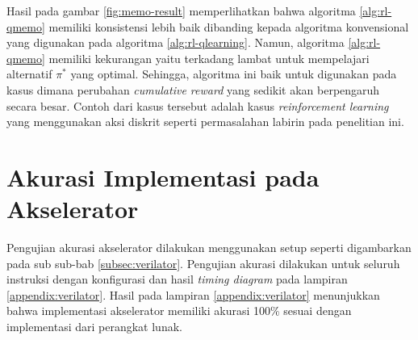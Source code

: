 Hasil pada gambar \ref{fig:memo-result} memperlihatkan bahwa algoritma \ref{alg:rl-qmemo} memiliki konsistensi lebih baik dibanding kepada algoritma konvensional yang digunakan pada algoritma \ref{alg:rl-qlearning}. Namun, algoritma \ref{alg:rl-qmemo} memiliki kekurangan yaitu terkadang lambat untuk mempelajari alternatif $\pi^*$ yang optimal. Sehingga, algoritma ini baik untuk digunakan pada kasus dimana perubahan \textit{cumulative reward} yang sedikit akan berpengaruh secara besar. Contoh dari kasus tersebut adalah kasus \textit{reinforcement learning} yang menggunakan aksi diskrit seperti permasalahan labirin pada penelitian ini.

\section{Akurasi Implementasi pada Akselerator}

Pengujian akurasi akselerator dilakukan menggunakan setup seperti digambarkan pada sub sub-bab \ref{subsec:verilator}. Pengujian akurasi dilakukan untuk seluruh instruksi dengan konfigurasi dan hasil \textit{timing diagram} pada lampiran \ref{appendix:verilator}. Hasil pada lampiran \ref{appendix:verilator} menunjukkan bahwa implementasi akselerator memiliki akurasi 100\% sesuai dengan implementasi dari perangkat lunak.
